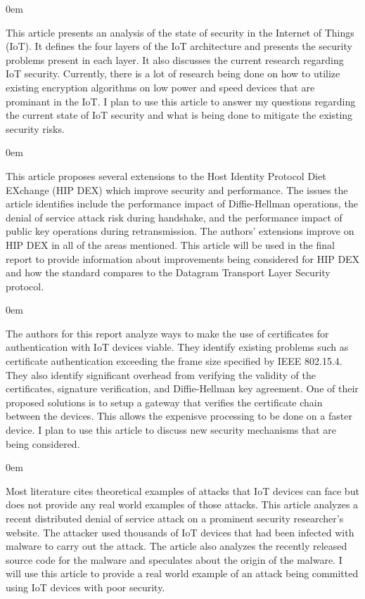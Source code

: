 \documentclass{article}
\newenvironment{annotation}{\begin{addmargin}[2.5em]{0em} \begin{flushleft}}{\end{flushleft} \end{addmargin}}
\begin{document}
\begin{annotation}
This article presents an analysis of the state of security in the Internet of Things (IoT). It defines the four layers of the IoT architecture and presents the security
problems present in each layer. It also discusses the current research regarding IoT security. Currently, there is a lot of research being done on how to utilize existing
encryption algorithms on low power and speed devices that are prominant in the IoT. I plan to use this article to answer my questions regarding the current state of IoT
security and what is being done to mitigate the existing security risks. 
\end{annotation}

\newpage
{}
\begin{annotation}
This article proposes several extensions to the Host Identity Protocol Diet EXchange (HIP DEX) which improve security and performance. The issues the article identifies include the performance impact of 
Diffie-Hellman operations, the denial of service attack risk during handshake, and the performance impact of public key operations during retransmission. The authors' extensions improve on HIP DEX in all of
the areas mentioned. This article will be used in the final report to provide information about improvements being considered for HIP DEX and how the standard compares to the Datagram Transport Layer Security protocol. 
\end{annotation}

\begin{annotation}
The authors for this report analyze ways to make the use of certificates for authentication with IoT devices viable. They identify existing problems such as certificate authentication exceeding the
frame size specified by IEEE 802.15.4. They also identify significant overhead from verifying the validity of the certificates, signature verification, and Diffie-Hellman key agreement. One of their
proposed solutions is to setup a gateway that verifies the certificate chain between the devices. This allows the expenisve processing to be done on a faster device. I plan to use this article to discuss
new security mechanisms that are being considered.
\end{annotation}

\begin{annotation}
Most literature cites theoretical examples of attacks that IoT devices can face but does not provide any real world examples of those attacks. This article analyzes a recent distributed denial of 
service attack on a prominent security researcher's website. The attacker used thousands of IoT devices that had been infected with malware to carry out the attack. The article also analyzes the
recently released source code for the malware and speculates about the origin of the malware. I will use this article to provide a real world example of an attack being committed using IoT devices with poor security. 
\end{annotation}
\end{document}
